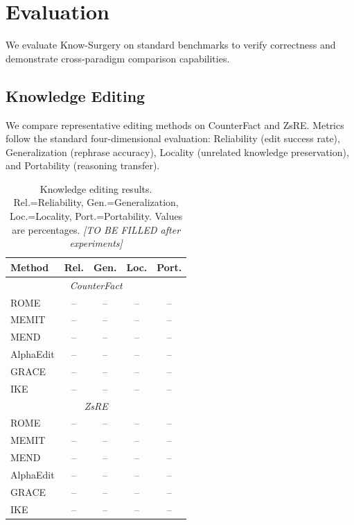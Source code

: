 \section{Evaluation}
\label{sec:eval}

We evaluate Know-Surgery on standard benchmarks to verify correctness and demonstrate cross-paradigm comparison capabilities.

\subsection{Knowledge Editing}

We compare representative editing methods on CounterFact and ZsRE. Metrics follow the standard four-dimensional evaluation: Reliability (edit success rate), Generalization (rephrase accuracy), Locality (unrelated knowledge preservation), and Portability (reasoning transfer).

\begin{table}[t]
\centering
\small
\begin{tabular}{lcccc}
\toprule
\textbf{Method} & \textbf{Rel.} & \textbf{Gen.} & \textbf{Loc.} & \textbf{Port.} \\
\midrule
\multicolumn{5}{c}{\textit{CounterFact}} \\
\midrule
ROME & -- & -- & -- & -- \\
MEMIT & -- & -- & -- & -- \\
MEND & -- & -- & -- & -- \\
AlphaEdit & -- & -- & -- & -- \\
GRACE & -- & -- & -- & -- \\
IKE & -- & -- & -- & -- \\
\midrule
\multicolumn{5}{c}{\textit{ZsRE}} \\
\midrule
ROME & -- & -- & -- & -- \\
MEMIT & -- & -- & -- & -- \\
MEND & -- & -- & -- & -- \\
AlphaEdit & -- & -- & -- & -- \\
GRACE & -- & -- & -- & -- \\
IKE & -- & -- & -- & -- \\
\bottomrule
\end{tabular}
\caption{Knowledge editing results. Rel.=Reliability, Gen.=Generalization, Loc.=Locality, Port.=Portability. Values are percentages. \textit{[TO BE FILLED after experiments]}}
\label{tab:edit}
\end{table}

